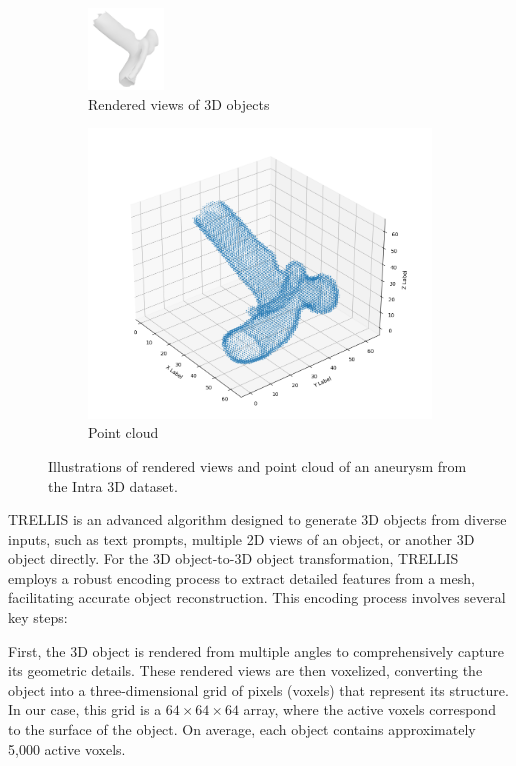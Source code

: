 \documentclass[%
 reprint,
 amsmath,amssymb,
 aps,
 floatfix,
 nofootinbib,
]{revtex4-2}
\begin{document}
\begin{figure}
\begin{subfigure}[b]{0.44\textwidth}
    \includegraphics[width=0.22\textwidth]{146.png}
    \caption{Rendered views of 3D objects}
  \end{subfigure}
  \hfill
  \begin{subfigure}[b]{0.44\textwidth}
    \includegraphics[width=\textwidth]{point_cloud.png}
    \caption{Point cloud}
  \end{subfigure}

  \caption{Illustrations of rendered views and point cloud of an aneurysm from the Intra 3D dataset.}
  \label{fig:combined_views}
\end{figure}

TRELLIS \citep{xiang2024structured} is an advanced algorithm designed to generate 3D objects from diverse inputs, such as text prompts, multiple 2D views of an object, or another 3D object directly. For the 3D object-to-3D object transformation, TRELLIS employs a robust encoding process to extract detailed features from a mesh, facilitating accurate object reconstruction. This encoding process involves several key steps:

First, the 3D object is rendered from multiple angles to comprehensively capture its geometric details. These rendered views are then voxelized, converting the object into a three-dimensional grid of pixels (voxels) that represent its structure. In our case, this grid is a $64 \times 64 \times 64$ array, where the active voxels correspond to the surface of the object. On average, each object contains approximately 5,000 active voxels.
\end{document}
